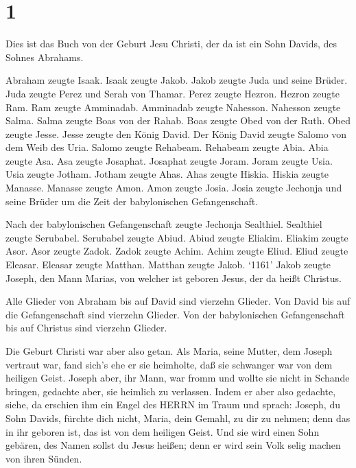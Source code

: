 \hypertarget{section}{%
\section{1}\label{section}}

 Dies ist das Buch von der Geburt Jesu Christi, der da ist
ein Sohn Davids, des Sohnes Abrahams.

 Abraham zeugte Isaak. Isaak zeugte Jakob. Jakob zeugte Juda
und seine Brüder.  Juda zeugte Perez und Serah von Thamar.
Perez zeugte Hezron. Hezron zeugte Ram.  Ram zeugte
Amminadab. Amminadab zeugte Nahesson. Nahesson zeugte Salma.
 Salma zeugte Boas von der Rahab. Boas zeugte Obed von der
Ruth. Obed zeugte Jesse.  Jesse zeugte den König David. Der
König David zeugte Salomo von dem Weib des Uria.  Salomo
zeugte Rehabeam. Rehabeam zeugte Abia. Abia zeugte Asa.  Asa
zeugte Josaphat. Josaphat zeugte Joram. Joram zeugte Usia. 
Usia zeugte Jotham. Jotham zeugte Ahas. Ahas zeugte Hiskia.
 Hiskia zeugte Manasse. Manasse zeugte Amon. Amon zeugte
Josia.  Josia zeugte Jechonja und seine Brüder um die Zeit
der babylonischen Gefangenschaft.

 Nach der babylonischen Gefangenschaft zeugte Jechonja
Sealthiel. Sealthiel zeugte Serubabel.  Serubabel zeugte
Abiud. Abiud zeugte Eliakim. Eliakim zeugte Asor.  Asor
zeugte Zadok. Zadok zeugte Achim. Achim zeugte Eliud. 
Eliud zeugte Eleasar. Eleasar zeugte Matthan. Matthan zeugte Jakob.
 `1161' Jakob zeugte Joseph, den Mann Marias, von welcher
ist geboren Jesus, der da heißt Christus.

 Alle Glieder von Abraham bis auf David sind vierzehn
Glieder. Von David bis auf die Gefangenschaft sind vierzehn Glieder. Von
der babylonischen Gefangenschaft bis auf Christus sind vierzehn Glieder.

 Die Geburt Christi war aber also getan. Als Maria, seine
Mutter, dem Joseph vertraut war, fand sich's ehe er sie heimholte, daß
sie schwanger war von dem heiligen Geist.  Joseph aber, ihr
Mann, war fromm und wollte sie nicht in Schande bringen, gedachte aber,
sie heimlich zu verlassen.  Indem er aber also gedachte,
siehe, da erschien ihm ein Engel des HERRN im Traum und sprach: Joseph,
du Sohn Davids, fürchte dich nicht, Maria, dein Gemahl, zu dir zu
nehmen; denn das in ihr geboren ist, das ist von dem heiligen Geist.
 Und sie wird einen Sohn gebären, des Namen sollst du Jesus
heißen; denn er wird sein Volk selig machen von ihren Sünden.

